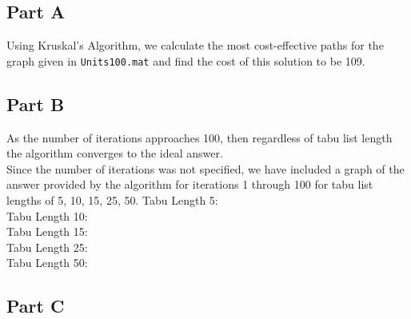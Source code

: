 \documentclass[a4paper]{article}
\begin{document}



\subsection{Part A}


Using Kruskal's Algorithm, we calculate the most cost-effective paths for the
graph given in \texttt{Units100.mat} and find the cost of this solution to be
109.

\subsection{Part B}

As the number of iterations approaches 100, then regardless of tabu list length the algorithm converges to the ideal answer. \\
Since the number of iterations was not specified, we have included a graph of the answer provided by the algorithm for iterations 1 through 100 for tabu list lengths of 5, 10, 15, 25, 50.
Tabu Length 5:   \\
Tabu Length 10: \\
Tabu Length 15: \\
Tabu Length 25: \\
Tabu Length 50: \\

\subsection{Part C}

\end{document}
